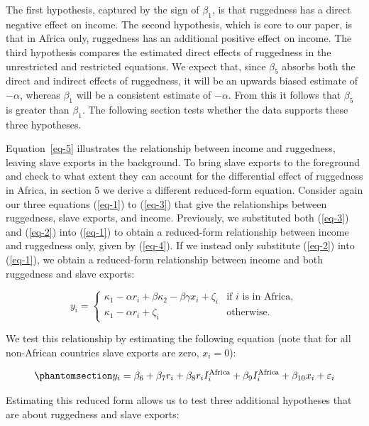 \documentclass[
  letterpaper,
  DIV=11,
  numbers=noendperiod]{scrartcl}
\begin{document}
The first hypothesis, captured by the sign of \(\beta_1\), is that
ruggedness has a direct negative effect on income. The second
hypothesis, which is core to our paper, is that in Africa only,
ruggedness has an additional positive effect on income. The third
hypothesis compares the estimated direct effects of ruggedness in the
unrestricted and restricted equations. We expect that, since \(\beta_5\)
absorbs both the direct and indirect effects of ruggedness, it will be
an upwards biased estimate of \(-\alpha\), whereas \(\beta_1\) will be a
consistent estimate of \(-\alpha\). From this it follows that
\(\beta_5\) is greater than \(\beta_1\). The following section tests
whether the data supports these three hypotheses.

Equation~\ref{eq-5} illustrates the relationship between income and
ruggedness, leaving slave exports in the background. To bring slave
exports to the foreground and check to what extent they can account for
the differential effect of ruggedness in Africa, in section 5 we derive
a different reduced-form equation. Consider again our three equations
(\ref{eq-1}) to (\ref{eq-3}) that give the relationships between
ruggedness, slave exports, and income. Previously, we substituted both
(\ref{eq-3}) and (\ref{eq-2}) into (\ref{eq-1}) to obtain a reduced-form
relationship between income and ruggedness only, given by (\ref{eq-4}).
If we instead only substitute (\ref{eq-2}) into (\ref{eq-1}), we obtain
a reduced-form relationship between income and both ruggedness and slave
exports:

\[
y_i = \begin{cases}
\kappa_1 - \alpha r_i + \beta \kappa_2 - \beta \gamma x_i + \zeta_i &\text{if }i\text{ is in Africa}, \\
\kappa_1 - \alpha r_i + \zeta_i &\text{otherwise}.
\end{cases}
\]

We test this relationship by estimating the following equation (note
that for all non-African countries slave exports are zero, \(x_i = 0\)):

\begin{equation}\protect\phantomsection\label{eq-7}{
y_i = \beta_6 + \beta_7 r_i + \beta_8 r_i I_i^\text{Africa} + \beta_9 I_i^\text{Africa} + \beta_{10}x_i + \varepsilon_i
}\end{equation}

Estimating this reduced form allows us to test three additional
hypotheses that are about ruggedness and slave exports:
\end{document}
